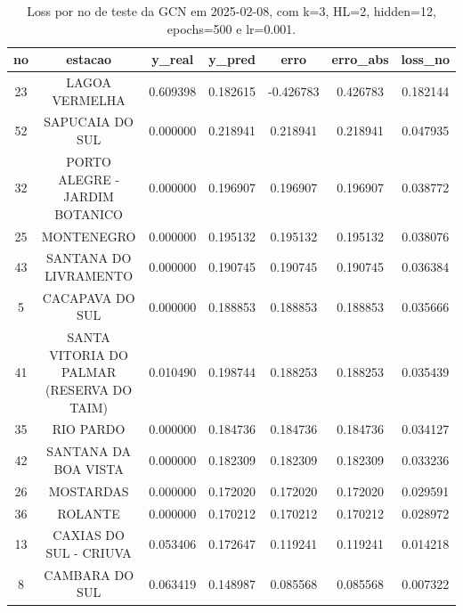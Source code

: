 \begin{table}[h]
\centering
\caption{Loss por no de teste da GCN em 2025-02-08, com k=3, HL=2, hidden=12, epochs=500 e lr=0.001.}
\label{tab:gcn_loss_k3_hl2_h12_e500_d20250208}
\begin{tabular}{ccccccc}
\toprule
no & estacao & y\_real & y\_pred & erro & erro\_abs & loss\_no \\
\midrule
23 & LAGOA VERMELHA & 0.609398 & 0.182615 & -0.426783 & 0.426783 & 0.182144 \\
52 & SAPUCAIA DO SUL & 0.000000 & 0.218941 & 0.218941 & 0.218941 & 0.047935 \\
32 & PORTO ALEGRE - JARDIM BOTANICO & 0.000000 & 0.196907 & 0.196907 & 0.196907 & 0.038772 \\
25 & MONTENEGRO & 0.000000 & 0.195132 & 0.195132 & 0.195132 & 0.038076 \\
43 & SANTANA DO LIVRAMENTO & 0.000000 & 0.190745 & 0.190745 & 0.190745 & 0.036384 \\
5 & CACAPAVA DO SUL & 0.000000 & 0.188853 & 0.188853 & 0.188853 & 0.035666 \\
41 & SANTA VITORIA DO PALMAR (RESERVA DO TAIM) & 0.010490 & 0.198744 & 0.188253 & 0.188253 & 0.035439 \\
35 & RIO PARDO & 0.000000 & 0.184736 & 0.184736 & 0.184736 & 0.034127 \\
42 & SANTANA DA BOA VISTA & 0.000000 & 0.182309 & 0.182309 & 0.182309 & 0.033236 \\
26 & MOSTARDAS & 0.000000 & 0.172020 & 0.172020 & 0.172020 & 0.029591 \\
36 & ROLANTE & 0.000000 & 0.170212 & 0.170212 & 0.170212 & 0.028972 \\
13 & CAXIAS DO SUL - CRIUVA & 0.053406 & 0.172647 & 0.119241 & 0.119241 & 0.014218 \\
8 & CAMBARA DO SUL & 0.063419 & 0.148987 & 0.085568 & 0.085568 & 0.007322 \\
\bottomrule
\end{tabular}
\end{table}
